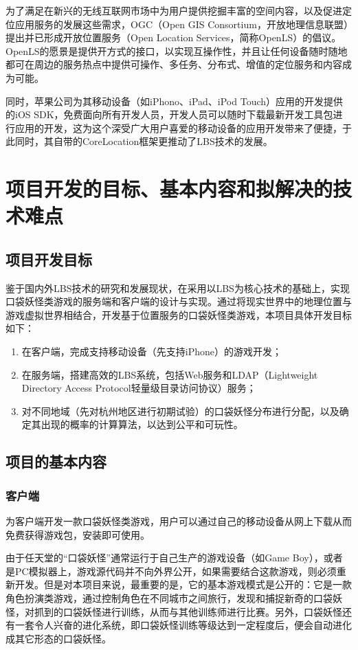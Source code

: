 \documentclass{article}
\begin{document}
\begin{CJK}{UTF8}{gbsn}
  为了满足在新兴的无线互联网市场中为用户提供挖掘丰富的空间内容，以及促进定位应用服务的发展这些需求，OGC（Open GIS Consortium，开放地理信息联盟）提出并已形成开放位置服务（Open Location Services，简称OpenLS）的倡议。OpenLS的愿景是提供开方式的接口，以实现互操作性，并且让任何设备随时随地都可在周边的服务热点中提供可操作、多任务、分布式、增值的定位服务和内容成为可能\cite{L13}。

  同时，苹果公司为其移动设备（如iPhono、iPad、iPod Touch）应用的开发提供的iOS SDK，免费面向所有开发人员，开发人员可以随时下载最新开发工具包进行应用的开发，这为这个深受广大用户喜爱的移动设备的应用开发带来了便捷，于此同时，其自带的CoreLocation框架更推动了LBS技术的发展。

	\section{项目开发的目标、基本内容和拟解决的技术难点}
  \subsection{项目开发目标}

  鉴于国内外LBS技术的研究和发展现状，在采用以LBS为核心技术的基础上，实现口袋妖怪类游戏的服务端和客户端的设计与实现。通过将现实世界中的地理位置与游戏虚拟世界相结合，开发基于位置服务的口袋妖怪类游戏，本项目具体开发目标如下：
  
  \begin{enumerate}
    \item 在客户端，完成支持移动设备（先支持iPhone）的游戏开发；
    \item 在服务端，搭建高效的LBS系统，包括Web服务和LDAP（Lightweight Directory Access Protocol轻量级目录访问协议）服务；
    \item 对不同地域（先对杭州地区进行初期试验）的口袋妖怪分布进行分配，以及确定其出现的概率的计算算法，以达到公平和可玩性。
  \end{enumerate}
  
  \subsection{项目的基本内容}
  \subsubsection{客户端}

  为客户端开发一款口袋妖怪类游戏，用户可以通过自己的移动设备从网上下载从而免费获得游戏包，安装即可使用。

  由于任天堂的“口袋妖怪”通常运行于自己生产的游戏设备（如Game Boy），或者是PC模拟器上，游戏源代码并不向外界公开，如果需要结合这款游戏，则必须重新开发。但是对本项目来说，最重要的是，它的基本游戏模式是公开的：它是一款角色扮演类游戏，通过控制角色在不同城市之间旅行，发现和捕捉新奇的口袋妖怪，对抓到的口袋妖怪进行训练，从而与其他训练师进行比赛。另外，口袋妖怪还有一套令人兴奋的进化系统，即口袋妖怪训练等级达到一定程度后，便会自动进化成其它形态的口袋妖怪。


\end{CJK}
\end{document}

